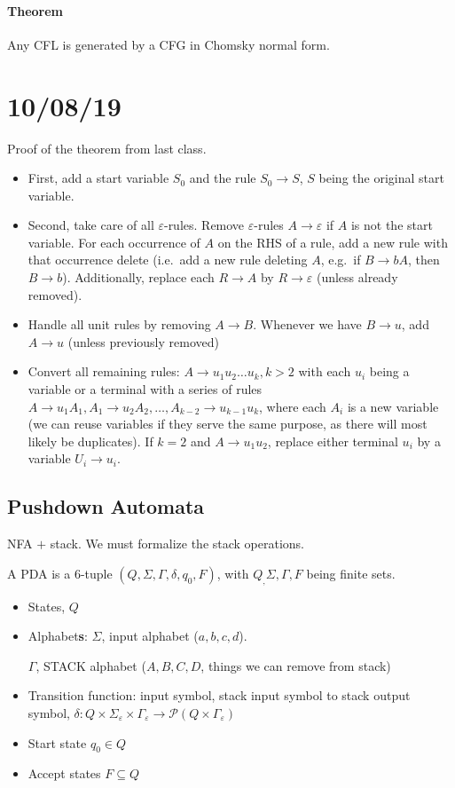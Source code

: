 \documentclass[12 pt]{article}
\begin{document}
\paragraph{Theorem} Any CFL is generated by a CFG in Chomsky normal
form.

\section{10/08/19}
Proof of the theorem from last class.

\begin{itemize}
\item First, add a start variable $S_0$ and the rule $S_0 \to S$, $S$ being
the original start variable.
\item Second, take care of all $\varepsilon$-rules. Remove
  $\varepsilon$-rules $A \to \varepsilon$ if $A$ is not the start
  variable. For each occurrence of $A$ on the RHS of a rule, add a new
  rule with that occurrence delete (i.e.\ add a new rule deleting $A$,
  e.g.\ if $B \to bA$, then $B \to b$). Additionally, replace each $R
  \to A$ by $R \to \varepsilon$ (unless already removed).
\item Handle all unit rules by removing $A \to B$. Whenever we have $B
  \to u$, add $A \to u$ (unless previously removed)
\item Convert all remaining rules: $A \to u_1u_2 \ldots u_k, k > 2$
  with each $u_i$ being a variable or a terminal with a series of
  rules $A \to u_1A_1, A_1 \to u_2 A_2, \ldots, A_{k-2} \to
  u_{k-1}u_k$, where each $A_i$ is a new variable (we can reuse
  variables if they serve the same purpose, as there
  will most likely be duplicates). If $k=2$ and $A \to
  u_1 u_2$, replace either terminal $u_i$ by a variable $U_i \to u_i$.
\end{itemize}
\subsection{Pushdown Automata}
NFA $+$ stack. We must formalize the stack operations.

A PDA is a $6$-tuple $(Q, \Sigma, \Gamma, \delta, q_0, F)$, with $Q_,
\Sigma, \Gamma, F$ being finite sets.
\begin{itemize}
\item States, $Q$
\item Alphabet\textbf{s}: $\Sigma$, input alphabet ($a, b, c, d$).

  $\Gamma$, STACK alphabet ($A, B, C, D$, things we can remove from stack)
\item Transition function: input symbol, stack input symbol to stack
  output symbol, $\delta: Q \times \Sigma_{\varepsilon} \times
  \Gamma_{\varepsilon} \to \mathcal{P}(Q \times \Gamma_{\varepsilon})$
\item Start state $q_0 \in Q$
\item Accept states $F \subseteq Q$
\end{itemize}
\end{document}
